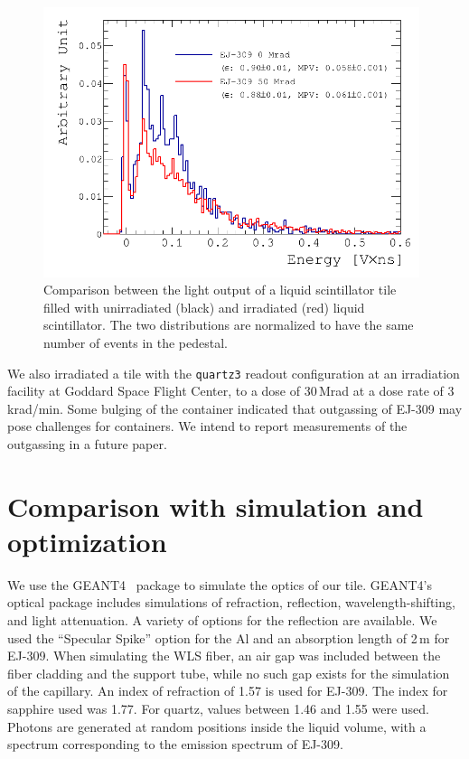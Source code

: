 \documentclass[review]{elsarticle}
\begin{document}
\begin{figure}[!ht]
\begin{center}
\includegraphics[width=0.98\textwidth]{./figures/RD_R7600_1_0_DBF_ALM_GRS_TH450_100814_all_1.png}
\caption{Comparison between the light output of a liquid scintillator
  tile filled with unirradiated (black) and irradiated (red) liquid
  scintillator. The two distributions are normalized to have the same
  number of events in the pedestal.}
\label{fig:ej309_irradiated}
\end{center}
\end{figure}

We also irradiated a tile with the \verb+quartz3+ readout
configuration at an irradiation facility at Goddard Space Flight
Center, to a dose of 30\,Mrad at a dose rate of 3\,krad/min.  Some
bulging of the container indicated that outgassing of EJ-309 may pose
challenges for containers.  We intend to report measurements of the
outgassing in a future paper.

\section{Comparison with simulation and optimization}
We use the GEANT4~\cite{Agostinelli2003250} package to simulate the
optics of our tile. GEANT4's optical package includes simulations of
refraction, reflection, wavelength-shifting, and light attenuation.
A variety of options for the reflection are available. We used the
``Specular Spike'' option for the Al and an absorption length of 2\,m for
EJ-309. When simulating the WLS fiber, an air gap was included
between the fiber cladding and the support tube, while no such gap
exists for the simulation of the capillary. An index of refraction of
1.57 is used for EJ-309. The index for sapphire used was 1.77.
For quartz, values between 1.46 and 1.55 were used. Photons are
generated at random positions inside the liquid volume, with a
spectrum corresponding to the emission spectrum of EJ-309.
\end{document}
